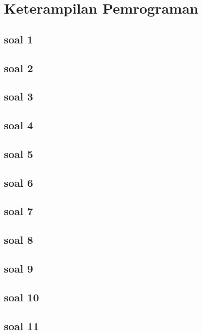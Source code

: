 \section{Keterampilan Pemrograman}
\subsection{soal 1}

\subsection{soal 2}

\subsection{soal 3}

\subsection{soal 4}

\subsection{soal 5}

\subsection{soal 6}

\subsection{soal 7}

\subsection{soal 8}

\subsection{soal 9}

\subsection{soal 10}

\subsection{soal 11}

